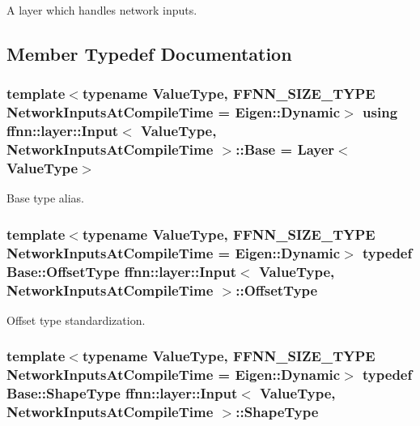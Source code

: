 A layer which handles network inputs. 

\subsection{Member Typedef Documentation}
\hypertarget{classffnn_1_1layer_1_1_input_a7d3eef885863ffbab29a2dba5b9d6e2a}{
\subsubsection[{Base}]{\setlength{\rightskip}{0pt plus 5cm}template$<$typename Value\-Type, F\-F\-N\-N\-\_\-\-S\-I\-Z\-E\-\_\-\-T\-Y\-P\-E Network\-Inputs\-At\-Compile\-Time = Eigen\-::\-Dynamic$>$ using {\bf ffnn\-::layer\-::\-Input}$<$ Value\-Type, Network\-Inputs\-At\-Compile\-Time $>$\-::{\bf Base} =  {\bf Layer}$<$Value\-Type$>$}}\label{classffnn_1_1layer_1_1_input_a7d3eef885863ffbab29a2dba5b9d6e2a}


Base type alias. 

\hypertarget{classffnn_1_1layer_1_1_input_af8249b647f4c1d4404ae98741b1686e1}{
\subsubsection[{Offset\-Type}]{\setlength{\rightskip}{0pt plus 5cm}template$<$typename Value\-Type, F\-F\-N\-N\-\_\-\-S\-I\-Z\-E\-\_\-\-T\-Y\-P\-E Network\-Inputs\-At\-Compile\-Time = Eigen\-::\-Dynamic$>$ typedef {\bf Base\-::\-Offset\-Type} {\bf ffnn\-::layer\-::\-Input}$<$ Value\-Type, Network\-Inputs\-At\-Compile\-Time $>$\-::{\bf Offset\-Type}}}\label{classffnn_1_1layer_1_1_input_af8249b647f4c1d4404ae98741b1686e1}


Offset type standardization. 

\hypertarget{classffnn_1_1layer_1_1_input_a98068063d95f6c495f2b6ffe5d2890a7}{
\subsubsection[{Shape\-Type}]{\setlength{\rightskip}{0pt plus 5cm}template$<$typename Value\-Type, F\-F\-N\-N\-\_\-\-S\-I\-Z\-E\-\_\-\-T\-Y\-P\-E Network\-Inputs\-At\-Compile\-Time = Eigen\-::\-Dynamic$>$ typedef {\bf Base\-::\-Shape\-Type} {\bf ffnn\-::layer\-::\-Input}$<$ Value\-Type, Network\-Inputs\-At\-Compile\-Time $>$\-::{\bf Shape\-Type}}}\label{classffnn_1_1layer_1_1_input_a98068063d95f6c495f2b6ffe5d2890a7}


